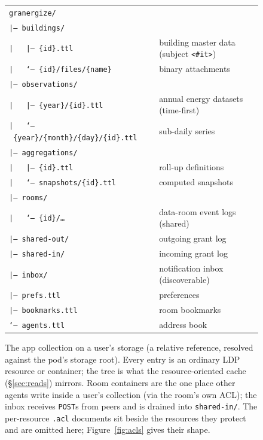 \documentclass[11pt,a4paper]{article}
\theoremstyle{remark}
\newcommand{\code}[1]{\texttt{#1}}
\begin{document}
\begin{figure}[t]
\begin{center}
\small
\begin{tabular}{@{}l@{\qquad}l@{}}
\texttt{granergize/} & \\
\texttt{|--~buildings/} & \\
\texttt{|~~~|--~\{id\}.ttl} & building master data (subject \texttt{<\#it>}) \\
\texttt{|~~~`--~\{id\}/files/\{name\}} & binary attachments \\
\texttt{|--~observations/} & \\
\texttt{|~~~|--~\{year\}/\{id\}.ttl} & annual energy datasets (time-first) \\
\texttt{|~~~`--~\{year\}/\{month\}/\{day\}/\{id\}.ttl} & sub-daily series \\
\texttt{|--~aggregations/} & \\
\texttt{|~~~|--~\{id\}.ttl} & roll-up definitions \\
\texttt{|~~~`--~snapshots/\{id\}.ttl} & computed snapshots \\
\texttt{|--~rooms/} & \\
\texttt{|~~~`--~\{id\}/\ldots} & data-room event logs (shared) \\
\texttt{|--~shared-out/} & outgoing grant log \\
\texttt{|--~shared-in/} & incoming grant log \\
\texttt{|--~inbox/} & notification inbox (discoverable) \\
\texttt{|--~prefs.ttl} & preferences \\
\texttt{|--~bookmarks.ttl} & room bookmarks \\
\texttt{`--~agents.ttl} & address book \\
\end{tabular}
\end{center}
\caption{The app collection on a user's storage (a relative reference,
resolved against the pod's storage root). Every entry is an ordinary LDP
resource or container; the tree is what the resource-oriented cache
(\S\ref{sec:reads}) mirrors. Room containers are the one place other agents
write inside a user's collection (via the room's own ACL); the inbox receives
\code{POST}s from peers and is drained into \code{shared-in/}. The
per-resource \code{.acl} documents sit beside the resources they protect and
are omitted here; Figure~\ref{fig:acls} gives their shape.}
\label{fig:podlayout}
\end{figure}
\end{document}
